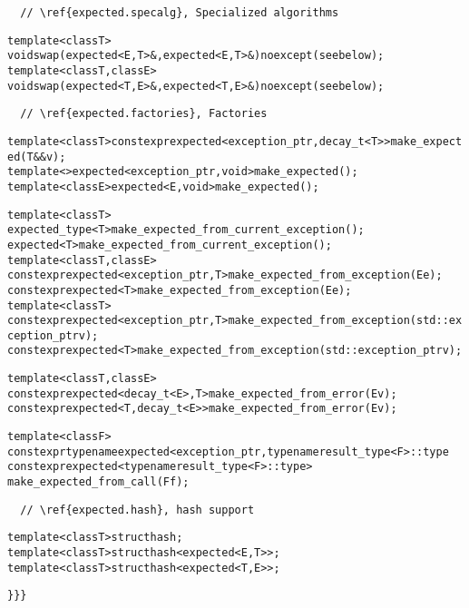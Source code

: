 \documentclass[a4paper,10pt]{article}
\newcommand{\suppress}[1]{\colorbox{suppress_color}{#1}}
\newcommand{\update}[1]{\colorbox{update_color}{#1}}
\begin{document}
\begin{lstlisting}
  // \ref{expected.specalg}, Specialized algorithms
\end{lstlisting}
\begin{alltt}
\suppress{  template <class T> }
\update{    void swap(expected<E,T>&, expected<E,T>&) noexcept(see below);}
\suppress{  template <class T, class E> }
\update{    void swap(expected<T,E>&, expected<T,E>&) noexcept(see below);}

\end{alltt}
\begin{lstlisting}
  // \ref{expected.factories}, Factories
\end{lstlisting}
\begin{alltt}
\suppress{  template <class T> constexpr expected<exception_ptr, decay_t<T>> make_expected(T&& v);}
\suppress{  template <> expected<exception_ptr, void> make_expected(); }
\suppress{  template <class E> expected<E,void> make_expected(); }
  
  template <class T>
\suppress{  expected_type<T> make_expected_from_current_exception();}
\update{  expected<T> make_expected_from_current_exception();}
  template <class T, class E>
\suppress{   constexpr expected<exception_ptr,T> make_expected_from_exception(E e); }
\update{   constexpr expected<T> make_expected_from_exception(E e); }
  template <class T>
\suppress{   constexpr expected<exception_ptr,T> make_expected_from_exception(std::exception_ptr v);   }
\update{   constexpr expected<T> make_expected_from_exception(std::exception_ptr v);   }
 
  template <class T, class E>
\suppress{   constexpr expected<decay_t<E>,T> make_expected_from_error(E v);}
\update{   constexpr expected<T, decay_t<E>> make_expected_from_error(E v);}

  template <class F>
\suppress{   constexpr typename expected<exception_ptr, typename result_type<F>::type}
\update{   constexpr expected<typename result_type<F>::type>}
   make_expected_from_call(F f);

\end{alltt}
\begin{lstlisting}
  // \ref{expected.hash}, hash support
\end{lstlisting}
\begin{alltt}
  template <class T> struct hash;
\suppress{  template <class T> struct hash<expected<E,T>>;}
\update{  template <class T> struct hash<expected<T,E>>;}
\end{alltt}
\begin{lstlisting}
}}}
\end{lstlisting}
\end{document}
